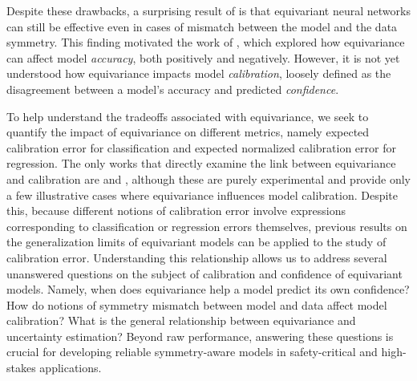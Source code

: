 \documentclass[10pt]{article} %
\theoremstyle{definition}
\begin{document}
Despite these drawbacks, a surprising result of \cite{wang2023the} is that equivariant
neural networks can still be effective even in cases of mismatch between the model and the data symmetry. This finding motivated the work of \cite{wang2024general}, which explored how equivariance can affect model \textit{accuracy}, both positively and negatively. However, it is not yet understood how equivariance impacts model \textit{calibration}, loosely defined as the disagreement between a model's accuracy and predicted \textit{confidence}. 

To help understand the tradeoffs associated with equivariance, we seek to quantify the impact of equivariance on different metrics, namely expected calibration error for classification and expected normalized calibration error for regression. The only works that directly examine the link between equivariance and calibration are \cite{sun2023probabilistic} and \cite{cherif2024uncertainty}, although these are purely experimental and provide only a few illustrative cases where equivariance influences model calibration. Despite this, because different notions of calibration error involve expressions corresponding to classification or regression errors themselves, previous results on the generalization limits of equivariant models can be applied to the study of calibration error. Understanding this relationship allows us to address several unanswered questions on the subject of calibration and confidence of equivariant models. Namely, when does equivariance help a model predict its own confidence? How do notions of symmetry mismatch between model and data affect model calibration? What is the general relationship between equivariance and uncertainty estimation? Beyond raw performance, answering these questions is crucial for developing reliable symmetry-aware models in safety-critical and high-stakes applications.
\end{document}
